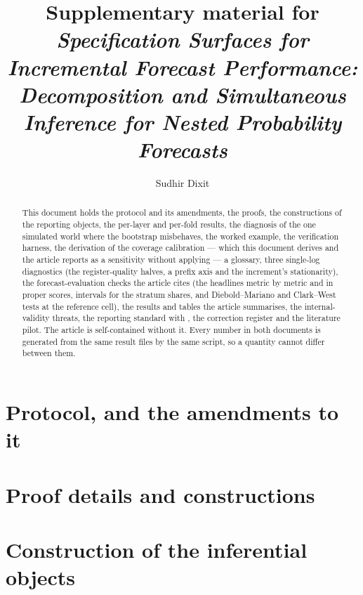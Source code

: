\documentclass[preprint,12pt,authoryear]{elsarticle}
\theoremstyle{definition}
\newif\ifblind
\begin{document}
\begin{frontmatter}

\title{Supplementary material for\\
\emph{Specification Surfaces for Incremental Forecast Performance:
Decomposition and Simultaneous Inference for Nested Probability Forecasts}}

\ifblind\else
\author[ind]{Sudhir Dixit}
\address[ind]{Independent Researcher, \affiliationStreet, \affiliationCity, \affiliationRegion, \affiliationCountry}
\fi

\begin{abstract}
This document holds the protocol and its amendments, the proofs, the
constructions of the reporting objects, the per-layer and per-fold results,
the diagnosis of the one simulated world where the bootstrap misbehaves, the
worked example, the verification harness, the derivation of the coverage
calibration --- which this document derives and the article reports as a
sensitivity without applying --- a glossary, three single-log diagnostics
(the register-quality halves, a prefix axis and the increment's
stationarity), the forecast-evaluation checks the article cites (the
headlines metric by metric and in proper scores, intervals for the stratum
shares, and Diebold--Mariano and Clark--West tests at the reference cell),
the results and tables the article summarises, the internal-validity threats,
the reporting standard with \pkgname, the correction register and the
literature pilot. The article is self-contained without it. Every number in both documents is
generated from the same result files by the same script, so a quantity cannot
differ between them.
\end{abstract}

\end{frontmatter}

\tableofcontents
\clearpage
\section{Protocol, and the amendments to it}
\label{app:protocol}


\section{Proof details and constructions}
\label{app:props}


\section{Construction of the inferential objects}
\label{app:objects}

\end{document}
